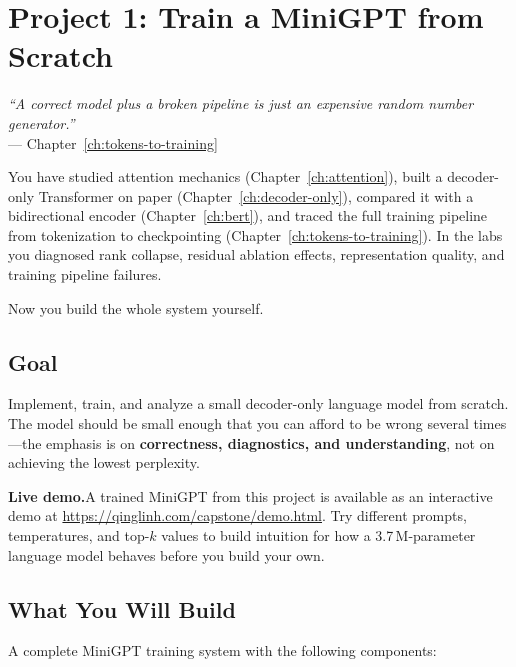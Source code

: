 \chapter*{Project 1: Train a MiniGPT from Scratch}
\label{project:minigpt}

\begin{center}
\textit{``A correct model plus a broken pipeline is just an expensive random number generator.''}\\[0.5em]
--- Chapter~\ref{ch:tokens-to-training}
\end{center}

\bigskip

\noindent You have studied attention mechanics (Chapter~\ref{ch:attention}), built a decoder-only Transformer on paper (Chapter~\ref{ch:decoder-only}), compared it with a bidirectional encoder (Chapter~\ref{ch:bert}), and traced the full training pipeline from tokenization to checkpointing (Chapter~\ref{ch:tokens-to-training}). In the labs you diagnosed rank collapse, residual ablation effects, representation quality, and training pipeline failures.

Now you build the whole system yourself.

\section*{Goal}

Implement, train, and analyze a small decoder-only language model from scratch. The model should be small enough that you can afford to be wrong several times---the emphasis is on \textbf{correctness, diagnostics, and understanding}, not on achieving the lowest perplexity.

\medskip
\noindent\textbf{Live demo.}\quad A trained MiniGPT from this project is available as an interactive demo at \url{https://qinglinh.com/capstone/demo.html}. Try different prompts, temperatures, and top-$k$ values to build intuition for how a 3.7\,M-parameter language model behaves before you build your own.

\section*{What You Will Build}

A complete MiniGPT training system with the following components:

